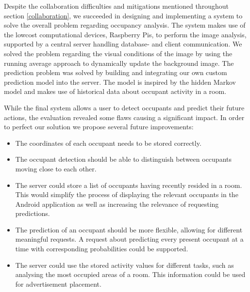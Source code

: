 Despite the collaboration difficulties and mitigations mentioned throughout section \ref{collaboration}, we succeeded in designing and implementing a system to solve the overall problem regarding occupancy analysis. The system makes use of the lowcost computational devices, Raspberry Pis, to perform the image analysis, supported by a central server handling database- and client communication. We solved the problem regarding the visual conditions of the image by using the running average approach to dynamically update the background image. The prediction problem was solved by building and integrating our own custom prediction model into the server. The model is inspired by the hidden Markov model and makes use of historical data about occupant activity in a room. 

While the final system allows a user to detect occupants and predict their future actions, the evaluation revealed some flaws causing a significant impact. In order to perfect our solution we propose several future improvements: 
\begin{itemize}
\item The coordinates of each occupant needs to be stored correctly.
\item The occupant detection should be able to distinguish between occupants moving close to each other.
\item The server could store a list of occupants having recently resided in a room. This would simplify the process of displaying the relevant occupants in the Android application as well as increasing the relevance of requesting predictions.
\item The prediction of an occupant should be more flexible, allowing for different meaningful requests. A request about predicting every present occupant at a time with corresponding probabilities could be supported. 
\item The server could use the stored activity values for different tasks, such as analysing the most occupied areas of a room. This information could be used for advertisement placement.
\end{itemize}